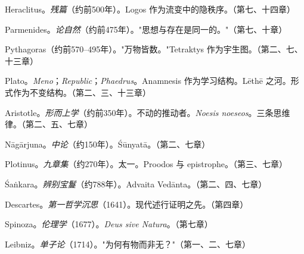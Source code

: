 \documentclass[10pt, openany, oneside]{book}
\renewcommand{\footnotesize}{\fontsize{8.5}{11}\selectfont}
\begin{document}
{\footnotesize

\noindent Heraclitus。\textit{残篇}（约前500年）。Logos 作为流变中的隐秩序。（第七、十四章）

\vspace{0.3em}

\noindent Parmenides。\textit{论自然}（约前475年）。"思想与存在是同一的。"（第七、十章）

\vspace{0.3em}

\noindent Pythagoras（约前570--495年）。"万物皆数。"Tetraktys 作为宇生图。（第二、七、十三章）

\vspace{0.3em}

\noindent Plato。\textit{Meno}；\textit{Republic}；\textit{Phaedrus}。Anamnesis 作为学习结构。L\={e}th\={e} 之河。形式作为不变结构。（第二、三、十三章）

\vspace{0.3em}

\noindent Aristotle。\textit{形而上学}（约前350年）。不动的推动者。\textit{Noesis noeseos}。三条思维律。（第二、五、七章）

\vspace{0.3em}

\noindent N\={a}g\={a}rjuna。\textit{中论}（约150年）。\'{S}\={u}nyat\={a}。（第二、七章）

\vspace{0.3em}

\noindent Plotinus。\textit{九章集}（约270年）。太一。Proodos 与 epistrophe。（第三、七章）

\vspace{0.3em}

\noindent \'{S}a\.{n}kara。\textit{辨别宝鬘}（约788年）。Advaita Ved\={a}nta。（第二、四、七章）

\vspace{0.3em}

\noindent Descartes。\textit{第一哲学沉思}（1641）。现代述行证明之先。（第四章）

\vspace{0.3em}

\noindent Spinoza。\textit{伦理学}（1677）。\textit{Deus sive Natura}。（第七章）

\vspace{0.3em}

\noindent Leibniz。\textit{单子论}（1714）。"为何有物而非无？"（第一、二、七章）

\vspace{0.3em}

}
\end{document}
